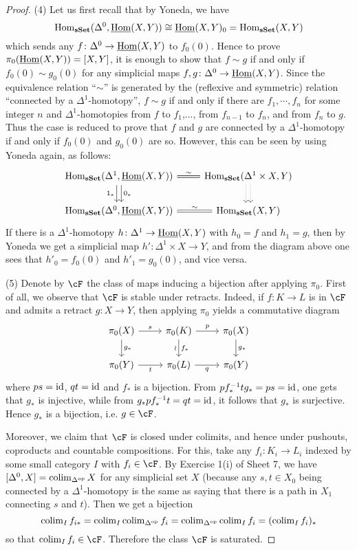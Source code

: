 \documentclass[a4paper,11pt,openany]{scrartcl}
\begin{document}
\begin{proof}
(4) Let us first recall that by Yoneda, we have
\[
\operatorname{Hom}_{\operatorname{\mathbf{sSet}}}(\Delta^0,\underline{\operatorname{Hom}}(X,Y))\cong\underline{\operatorname{Hom}}(X,Y)_0=\operatorname{Hom}_{\operatorname{\mathbf{sSet}}}(X,Y)
\]
which sends any $f\colon\Delta^0\to\underline{\operatorname{Hom}}(X,Y)$ to $f_0(0)$. Hence to prove $\pi_0(\underline{\operatorname{Hom}}(X,Y))=[X,Y]$, it is enough to show that $f\sim g$ if and only if $f_0(0)\sim g_0(0)$ for any simplicial maps $f,g\colon\Delta^0\to\underline{\operatorname{Hom}}(X,Y)$. Since the equivalence relation ``$\sim$'' is generated by the (reflexive and symmetric) relation ``connected by a $\Delta^1$-homotopy'', $f\sim g$ if and only if there are $f_1,\cdots,f_n$ for some integer $n$ and $\Delta^1$-homotopies from $f$ to $f_1$,..., from $f_{n-1}$ to $f_n$, and from $f_n$ to $g$. Thus the case is reduced to prove that $f$ and $g$ are connected by a $\Delta^1$-homotopy if and only if $f_0(0)$ and $g_0(0)$ are so. However, this can be seen by using Yoneda again, as follows:
\[
\begin{tikzcd}
\Hom_{\sSet}(\Delta^1,\ihom(X,Y))\arrow[r,equal,"\sim"]\arrow[d,"0_*",shift left]\arrow[d,"1_*"',shift right]& \Hom_{\sSet}(\Delta^1\times X,Y)\arrow[d,dotted,shift left]\arrow[d,dotted,shift right]\\
\Hom_{\sSet}(\Delta^0,\ihom(X,Y))\arrow[r,equal,"\sim"]& \Hom_{\sSet}(X,Y)
\end{tikzcd}
\] 
If there is a $\Delta^1$-homotopy $h\colon\Delta^1\to\underline{\operatorname{Hom}}(X,Y)$ with $h_0=f$ and $h_1=g$, then by Yoneda we get a simplicial map $h'\colon\Delta^1\times X\to Y$, and from the diagram above one sees that $h'_0=f_0(0)$ and $h'_1=g_0(0)$, and vice versa.

(5) Denote by $\cF$ the class of maps inducing a bijection after applying $\pi_0$. First of all, we observe that $\cF$ is stable under retracts. Indeed, if $f\colon K\to L$ is in $\cF$ and admits a retract $g\colon X\to Y$, then applying $\pi_0$ yields a commutative diagram
\[
\begin{tikzcd}
\pi_0(X)\arrow[r,"s"]\arrow[d,"g_*"]& \pi_0(K)\arrow[d,"f_*", "\wr"']\arrow[r,"p"]& \pi_0(X)\arrow[d,"g_*"]\\
\pi_0(Y)\arrow[r,"t"']& \pi_0(L)\arrow[r,"q"']& \pi_0(Y)
\end{tikzcd}
\]
where $ps=\operatorname{id}$, $qt=\operatorname{id}$ and $f_*$ is a bijection. From $pf_*^{-1}tg_*=ps=\operatorname{id}$, one gets that $g_*$ is injective, while from $g_*pf_*^{-1}t=qt=\operatorname{id}$, it follows that $g_*$ is surjective. Hence $g_*$ is a bijection, i.e. $g\in\cF$. 

Moreover, we claim that $\cF$ is closed under colimits, and hence under pushouts, coproducts and countable compositions. For this, take any $f_i\colon K_i\to L_i$ indexed by some small category $I$ with $f_i\in\cF$. By Exercise 1(i) of Sheet 7, we have $[\Delta^0,X]=\operatorname{colim}_{\Delta^{\operatorname{op}}}X$ for any simplicial set $X$ (because any $s,t\in X_0$ being connected by a $\Delta^1$-homotopy is the same as saying that there is a path in $X_1$ connecting $s$ and $t$). Then we get a bijection 
\[
\operatorname{colim}_If_{i*}=\operatorname{colim}_I\operatorname{colim}_{\Delta^{\operatorname{op}}}f_i=\operatorname{colim}_{\Delta^{\operatorname{op}}}\operatorname{colim}_If_i=(\operatorname{colim}_If_i)_*
\]
so that $\colim_If_i\in\cF$. Therefore the class $\cF$ is saturated.


\end{proof}
\end{document}
